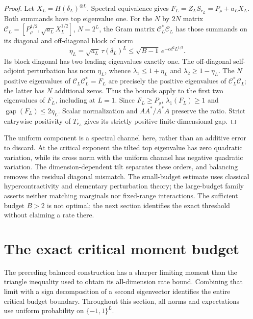 \documentclass[11pt]{article}
\newcommand{\gap}{\operatorname{gap}}
\begin{document}
\begin{proof}
Let $X_L=H(\delta_L)^{\otimes L}$. Spectral equivalence gives
$F_L=Z_LS_{r_L}=P_\rho+a_LX_L$. Both summands have top eigenvalue one.
For the $N$ by $2N$ matrix
$\mathcal C_L=[P_\rho^{1/2},\sqrt{a_L}X_L^{1/2}]$, $N=2^L$,
the Gram matrix $\mathcal C_L^*\mathcal C_L$ has those summands on
its diagonal and off-diagonal block of norm
\[
 \eta_L=\sqrt{a_L}\,\tau(\delta_L)^L
 \le\sqrt{B-1}\,e^{-cd^2L^{1/3}}.
\]
Its block diagonal has two leading eigenvalues exactly one. The
off-diagonal self-adjoint perturbation has norm $\eta_L$, whence
$\lambda_1\le1+\eta_L$ and $\lambda_2\ge1-\eta_L$.
The $N$ positive eigenvalues of $\mathcal C_L\mathcal C_L^*=F_L$
are precisely the positive eigenvalues of $\mathcal C_L^*\mathcal C_L$;
the latter has $N$ additional zeros. Thus the bounds apply to the first
two eigenvalues of $F_L$, including at $L=1$. Since $F_L\ge P_\rho$,
$\lambda_1(F_L)\ge1$ and $\gap(F_L)\le2\eta_L$.
Scalar normalization and $AA^*/A^*A$ preserve the ratio. Strict entrywise
positivity of $T_{r_L}$ gives its strictly positive finite-dimensional gap.
\end{proof}

The uniform component is a spectral channel here, rather than an additive
error to discard. At the critical exponent the tilted top eigenvalue has
zero quadratic variation, while its cross norm with the uniform channel
has negative quadratic variation. The dimension-dependent tilt separates
these orders, and balancing removes the residual diagonal mismatch.
The small-budget estimate uses classical hypercontractivity and elementary
perturbation theory; the large-budget family asserts neither matching
marginals nor fixed-range interactions. The sufficient
budget $B>2$ is not optimal; the next section identifies the exact
threshold without claiming a rate there.

\section{The exact critical moment budget}\label{sec:critical-exact}
The preceding balanced construction has a sharper limiting moment than
the triangle inequality used to obtain its all-dimension rate bound.
Combining that limit with a sign decomposition of a second eigenvector
identifies the entire critical budget boundary. Throughout this section,
all norms and expectations use uniform probability on $\{-1,1\}^L$.
\end{document}
